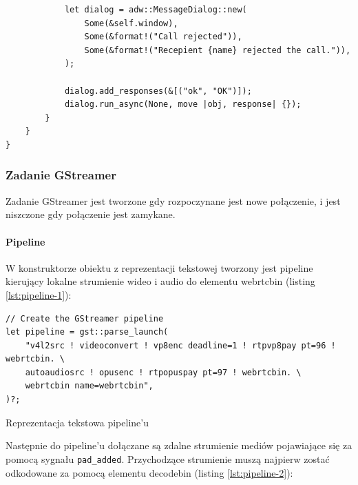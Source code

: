 \begin{verbatim}
            let dialog = adw::MessageDialog::new(
                Some(&self.window),
                Some(&format!("Call rejected")),
                Some(&format!("Recepient {name} rejected the call.")),
            );

            dialog.add_responses(&[("ok", "OK")]);
            dialog.run_async(None, move |obj, response| {});
        }
    }
}
\end{verbatim}

\subsubsection{Zadanie GStreamer}

Zadanie GStreamer jest tworzone gdy rozpoczynane jest nowe połączenie, i jest niszczone gdy
połączenie jest zamykane.

\paragraph{Pipeline}

W konstruktorze obiektu z reprezentacji tekstowej tworzony jest pipeline kierujący lokalne
strumienie wideo i audio do elementu webrtcbin (listing \ref{lst:pipeline-1}):

\begin{listing}[H]
    \begin{verbatim}
// Create the GStreamer pipeline
let pipeline = gst::parse_launch(
    "v4l2src ! videoconvert ! vp8enc deadline=1 ! rtpvp8pay pt=96 ! webrtcbin. \
    autoaudiosrc ! opusenc ! rtpopuspay pt=97 ! webrtcbin. \
    webrtcbin name=webrtcbin",
)?;
\end{verbatim}
    \caption{Reprezentacja tekstowa pipeline'u}
    \label{lst:pipeline-1}
\end{listing}

Następnie do pipeline'u dołączane są zdalne strumienie mediów pojawiające się za pomocą sygnału
\verb|pad_added|. Przychodzące strumienie muszą najpierw zostać odkodowane za pomocą elementu
decodebin (listing \ref{lst:pipeline-2}):


